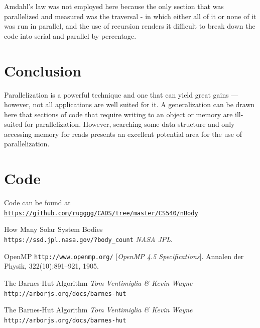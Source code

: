 \documentclass[11pt]{article}
\begin{document}
Amdahl's law was not employed here because the only section that was parallelized and measured was the traversal - in which either all of it or none of it was run in parallel, and the use of recursion renders it difficult to break down the code into serial and parallel by percentage.


\section{Conclusion}
Parallelization is a powerful technique and one that can yield great gains --- however, not all applications are well suited for it. A generalization can be drawn here that sections of code that require writing to an object or memory are ill-suited for parallelization. However, searching some data structure and only accessing memory for reads presents an excellent potential area for the use of parallelization. 

\section{Code}

Code can be found at \texttt{\href{https://github.com/rugggg/CADS/tree/master/CS540/nBody}{https://github.com/rugggg/CADS/tree/master/CS540/nBody}}

\begin{thebibliography}{9}
How Many Solar System Bodies
\\\texttt{https://ssd.jpl.nasa.gov/?body\_count}
\textit{NASA JPL}. 
 
OpenMP
\texttt{http://www.openmp.org/}
[\textit{OpenMP 4.5 Specifications}]. 
Annalen der Physik, 322(10):891–921, 1905.
 
The Barnes-Hut Algorithm
\textit{Tom Ventimiglia \& Kevin Wayne}
\\\texttt{http://arborjs.org/docs/barnes-hut}

The Barnes-Hut Algorithm
\textit{Tom Ventimiglia \& Kevin Wayne}
\\\texttt{http://arborjs.org/docs/barnes-hut}
\end{thebibliography}
\end{document}

